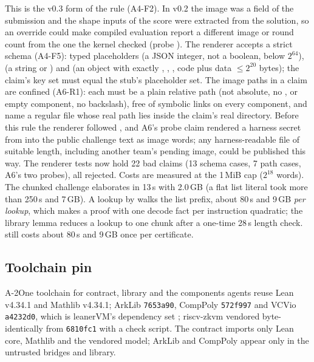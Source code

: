 \noindent This is the v0.3 form of the rule (A4-F2). In v0.2 the image was a field of the submission
and the shape inputs of the score were extracted from the solution, so an 
override could make compiled evaluation report a different image or round count from the one the
kernel checked (probe ). The renderer accepts a strict schema (A4-F5): typed
placeholders  (a JSON integer, not a boolean, below $2^{64}$),
 (a string  or ) and  (an object with
exactly , , , code plus data $\le2^{20}$ bytes); the claim's key
set must equal the stub's placeholder set. The image
paths in a claim are confined (A6-R1): each must be a plain relative path (not absolute, no
,  or empty component, no backslash), free of symbolic links on every component,
and name a regular file whose real path lies inside the claim's real directory. Before this rule the
renderer followed , and A6's probe claim rendered a harness secret
from  into the public challenge text as image words; any harness-readable file of
suitable length, including another team's pending image, could be published this way. The
renderer tests now hold 22 bad claims (13 schema cases, 7 path cases, A6's two probes), all
rejected. Costs are
measured at the 1\,MiB cap ($2^{18}$ words). The chunked challenge elaborates in 13\,s with 2.0\,GB
(a flat list literal took more than 250\,s and 7\,GB). A lookup  by
 walks the list prefix, about 80\,s and 9\,GB \emph{per lookup}, which makes a
proof with one decode fact per instruction quadratic; the library lemma 
reduces a lookup to one chunk after a one-time 28\,s length check. 
still costs about 80\,s and 9\,GB once per certificate.

\subsection{Toolchain pin}\label{subsec:arch-toolchain}

\begin{decision}{A-2}{One toolchain for contract, library and the components agents reuse}
Lean v4.34.1 and Mathlib v4.34.1; ArkLib \texttt{7653a90}, CompPoly \texttt{572f997} and VCVio
\texttt{a4232d0}, which is leanerVM's dependency set \cite{verifiedzkevm}; riscv-zkvm
 vendored byte-identically from \texttt{6810fc1} with a check script. The contract
imports only Lean core, Mathlib and the vendored model; ArkLib and CompPoly appear only in the
untrusted bridges and library.
\end{decision}

